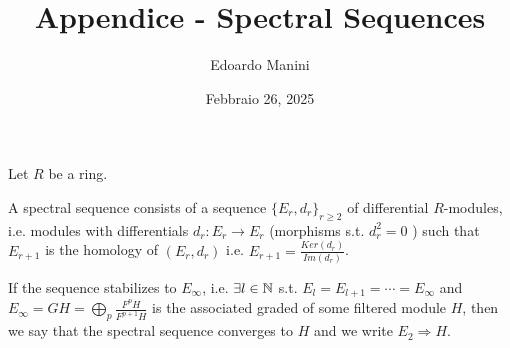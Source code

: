 \documentclass[../main.tex]{subfiles}
\title{Appendice - Spectral Sequences}
\author{Edoardo Manini}
\date{Febbraio 26, 2025}
\begin{document}
\ifSubfilesClassLoaded{
\maketitle
\tableofcontents
}{}

Let $R$ be a ring.

\begin{defn} \label{SpSeqDef1}
A spectral sequence consists of a sequence  $\{E_r,d_r\}_{r\geq 2}$ of differential $R$-modules, i.e. modules with differentials $d_r\colon E_r\to E_r$ (morphisms s.t. $d_r^2 = 0$ )  such that $E_{r+1}$ is the homology of $(E_r,d_r)$ i.e.  $E_{r+1} = \frac{Ker(d_r)}{Im(d_r)}$.
\end{defn}
If the sequence stabilizes to $E_{\infty}$, i.e. $\exists l \in \mathbb{N} $ s.t. $E_{l} = E_{l+1} = \cdots = E_{\infty}$ and $E_{\infty} = GH = \bigoplus_{p}\frac{F^pH}{F^{p+1}H}$ is the associated graded of some filtered module $H$, then we say that the spectral sequence converges to $H$ and we write $E_2\Rightarrow H$.
\end{document}
